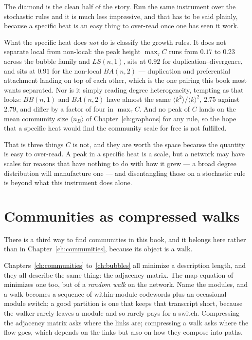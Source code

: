 The diamond is the clean half of the story. Run the same instrument over the
stochastic rules and it is much less impressive, and that has to be said plainly,
because a specific heat is an easy thing to over-read once one has seen it work.



\noindent What the specific heat does \emph{not} do is classify the growth rules. It
does not separate local from non-local: the peak height $\max_\tau C$ runs from
$0.17$ to $0.23$ across the bubble family and $LS(n,1)$, sits at $0.92$ for
duplication--divergence, and sits at $0.91$ for the non-local $BA(n,2)$ ---
duplication and preferential attachment landing on top of each other, which is the
one pairing this book most wants separated. Nor is it simply reading degree
heterogeneity, tempting as that looks: $BB(n,1)$ and $BA(n,2)$ have almost the same
$\langle k^2\rangle/\langle k\rangle^2$, $2.75$ against $2.79$, and differ by a
factor of four in $\max_\tau C$. And no peak of $C$ lands on the mean community size
$\langle n_B\rangle$ of Chapter~\ref{ch:graphons} for any rule, so the hope that a
specific heat would find the community scale for free is not fulfilled.

That is three things $C$ is not, and they are worth the space because the quantity
is easy to over-read. A peak in a specific heat is a scale, but a network may have
scales for reasons that have nothing to do with how it grew --- a broad degree
distribution will manufacture one --- and disentangling those on a stochastic rule is
beyond what this instrument does alone.


\section{Communities as compressed walks}

There is a third way to find communities in this book, and it belongs here rather
than in Chapter~\ref{ch:communities}, because its object is a walk.

Chapters~\ref{ch:communities} to~\ref{ch:bubbles} all minimize a description length,
and they all describe the same thing: the adjacency matrix. The map equation of
\citet{rosvall2008} minimizes one too, but of a \emph{random walk} on the network.
Name the modules, and a walk becomes a sequence of within-module codewords plus an
occasional module switch; a good partition is one that keeps that transcript short,
because the walker rarely leaves a module and so rarely pays for a switch. Compressing
the adjacency matrix asks where the links are; compressing a walk asks where the flow
goes, which depends on the links but also on how they compose into paths.

